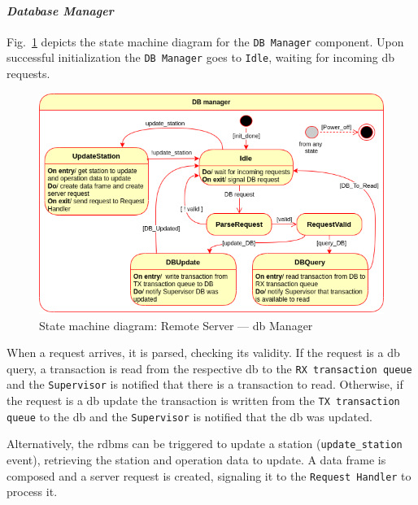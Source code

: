\paragraph{\emph{Database Manager}}
Fig.~\ref{fig:state-mach-rs-db} depicts the state machine diagram for the
\texttt{DB Manager} component. Upon successful initialization the
\texttt{DB Manager} goes to \texttt{Idle}, waiting for incoming \gls{db}
requests.
%
\begin{figure}[htb!]
\centering
    \includegraphics[width=0.7\columnwidth]{./img/state-mach-rs-db.png}
  \caption{State machine diagram: Remote Server --- \gls{db} Manager}%
\label{fig:state-mach-rs-db}
\end{figure}
%

When a request arrives, it is parsed, checking its validity. If the request is a
\gls{db} query, a transaction is read from the respective \gls{db} to the
\texttt{RX transaction queue} and the \texttt{Supervisor} is notified that there
is a transaction to read. Otherwise, if the request is a \gls{db} update
the transaction is written from the \texttt{TX transaction queue} to the
\gls{db} and the \texttt{Supervisor} is notified that the \gls{db} was updated.

Alternatively, the \gls{rdbms} can be triggered to update a station
(\texttt{update\_station} event), retrieving the station and operation data to
update. A data frame is composed and a server request is created, signaling it
to the \texttt{Request Handler} to process it.
%
